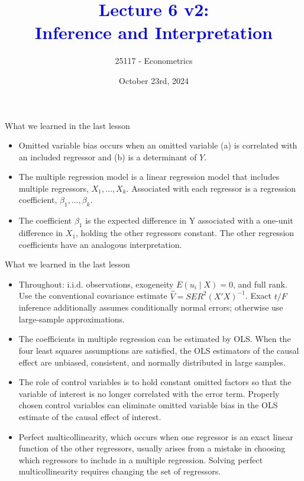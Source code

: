\documentclass[notes,10pt, aspectratio=169]{beamer}
\title[]{\textcolor{blue}{Lecture 6 v2:\\Inference and Interpretation}}
\author{25117 - Econometrics}
\institute[shortinst]{Universitat Pompeu Fabra}
\date{October 23rd, 2024}
\begin{document}
\begin{frame}[plain]
\maketitle
\end{frame}


\begin{frame}{What we learned in the last lesson}
\begin{itemize}
    \item Omitted variable bias occurs when an omitted variable (a) is correlated with an included regressor and (b) is a determinant of $Y$.\\[1em]
    \item The multiple regression model is a linear regression model that includes multiple regressors, $X_1, \dots, X_k$. Associated with each regressor is a regression coefficient, $\beta_1, \dots, \beta_k$.\\[1em]
    \item The coefficient $\beta_1$ is the expected difference in Y associated with a one-unit difference in $X_1$, holding the other regressors constant. The other regression coefficients have an analogous interpretation.\\[1em]
\end{itemize}
\end{frame}

\begin{frame}{What we learned in the last lesson}
\small
\begin{itemize}
    \item Throughout: i.i.d. observations, exogeneity $E(u_i\mid X)=0$, and full rank. Use the conventional covariance estimate $\widehat V=SER^2(X'X)^{-1}$. Exact $t/F$ inference additionally assumes conditionally normal errors; otherwise use large-sample approximations.
    \item The coefficients in multiple regression can be estimated by OLS. When the four least squares assumptions are satisfied, the OLS estimators of the causal effect are unbiased, consistent, and normally distributed in large samples.\\[.5em]
    \item The role of control variables is to hold constant omitted factors so that the variable of interest is no longer correlated with the error term. Properly chosen control variables can eliminate omitted variable bias in the OLS estimate of the causal effect of interest.\\[.5em]
    \item Perfect multicollinearity, which occurs when one regressor is an exact linear function of the other regressors, usually arises from a mistake in choosing which regressors to include in a multiple regression. Solving perfect multicollinearity requires changing the set of regressors.
\end{itemize}
\end{frame}
\end{document}
